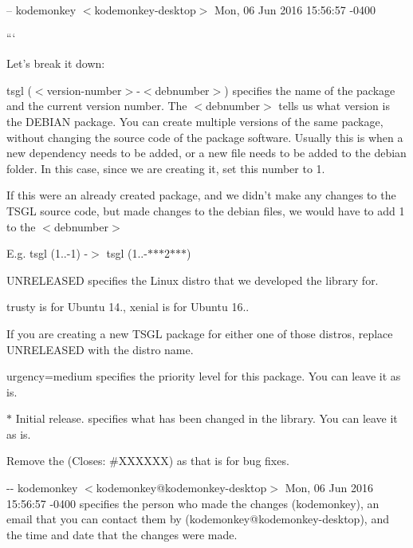 -- kodemonkey $<$kodemonkey-\/desktop$>$ Mon, 06 Jun 2016 15\-:56\-:57 -\/0400

```

Let's break it down\-:


\begin{DoxyItemize}
\item {\ttfamily tsgl ($<$version-\/number$>$-\/$<$debnumber$>$)} specifies the name of the package and the current version number. The {\ttfamily $<$debnumber$>$} tells us what version is the D\-E\-B\-I\-A\-N package. You can create multiple versions of the same package, without changing the source code of the package software. Usually this is when a new dependency needs to be added, or a new file needs to be added to the {\ttfamily debian} folder. In this case, since we are creating it, set this number to 1.
\end{DoxyItemize}

If this were an already created package, and we didn't make any changes to the T\-S\-G\-L source code, but made changes to the {\ttfamily debian} files, we would have to add 1 to the {\ttfamily $<$debnumber$>$}

E.\-g. tsgl (1..-\/1) -\/$>$ tsgl (1..-\/$\ast$$\ast$$\ast$2$\ast$$\ast$$\ast$)


\begin{DoxyItemize}
\item {\ttfamily U\-N\-R\-E\-L\-E\-A\-S\-E\-D} specifies the Linux distro that we developed the library for.
\end{DoxyItemize}

{\ttfamily trusty} is for {\ttfamily Ubuntu 14.}, {\ttfamily xenial} is for {\ttfamily Ubuntu 16.}.

If you are creating a new T\-S\-G\-L package for either one of those distros, replace {\ttfamily U\-N\-R\-E\-L\-E\-A\-S\-E\-D} with the distro name.


\begin{DoxyItemize}
\item {\ttfamily urgency=medium} specifies the priority level for this package. You can leave it as is.
\item {\ttfamily $\ast$ Initial release.} specifies what has been changed in the library. You can leave it as is.
\item Remove the {\ttfamily (Closes\-: \#\-X\-X\-X\-X\-X\-X)} as that is for bug fixes.
\item {\ttfamily -\/-\/ kodemonkey $<$kodemonkey@kodemonkey-\/desktop$>$ Mon, 06 Jun 2016 15\-:56\-:57 -\/0400} specifies the person who made the changes ({\ttfamily kodemonkey}), an email that you can contact them by ({\ttfamily kodemonkey@kodemonkey-\/desktop}), and the time and date that the changes were made.
\end{DoxyItemize}

